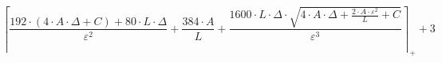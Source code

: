 \[\left\lceil \frac{192 \cdot \left(4 \cdot A \cdot \Delta + C\right) + 80 \cdot L \cdot \Delta}{\varepsilon^{2}} + \frac{384 \cdot A}{L} + \frac{1600 \cdot L \cdot \Delta \cdot \sqrt{4 \cdot A \cdot \Delta + \frac{2 \cdot A \cdot \varepsilon^{2}}{L} + C}}{\varepsilon^{3}} \right\rceil_{+} + 3\]
